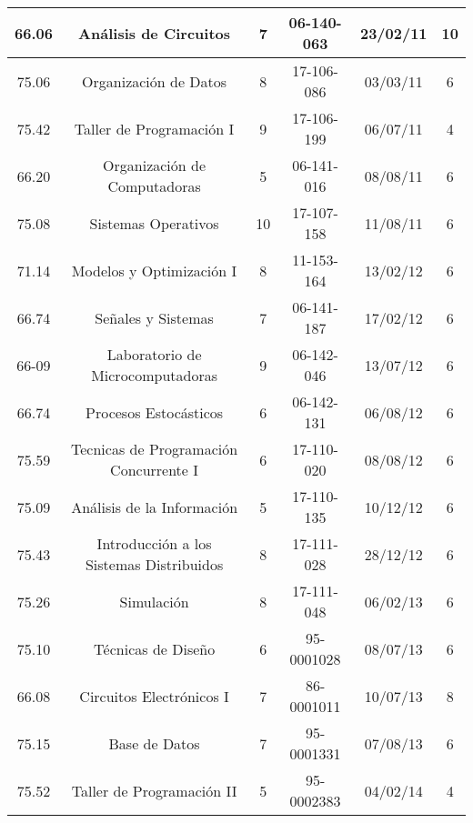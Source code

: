 {\begin{center}
\begin{tabular}{|c|c|c|c|c|c|}
            \hline
            66.06 & Análisis de Circuitos                      & 7  & 06-140-063 & 23/02/11 & 10 \\
            \hline
            75.06 & Organización de Datos                      & 8  & 17-106-086 & 03/03/11 & 6 \\
            \hline
            75.42 & Taller de Programación I                   & 9  & 17-106-199 & 06/07/11 & 4 \\
            \hline
            66.20 & Organización de Computadoras               & 5  & 06-141-016 & 08/08/11 & 6 \\
            \hline
            75.08 & Sistemas Operativos                        & 10 & 17-107-158 & 11/08/11 & 6 \\
            \hline 
            71.14 & Modelos y Optimización I                   & 8  & 11-153-164 & 13/02/12 & 6 \\
            \hline
            66.74 & Señales y Sistemas                         & 7  & 06-141-187 & 17/02/12 & 6 \\
            \hline
            66-09 & Laboratorio de Microcomputadoras           & 9  & 06-142-046 & 13/07/12 & 6 \\
            \hline
            66.74 & Procesos Estocásticos                      & 6  & 06-142-131 & 06/08/12 & 6 \\
            \hline
            75.59 & Tecnicas de Programación Concurrente I     & 6  & 17-110-020 & 08/08/12 & 6 \\
            \hline
            75.09 & Análisis de la Información                 & 5  & 17-110-135 & 10/12/12 & 6 \\
            \hline
            75.43 & Introducción a los Sistemas Distribuidos   & 8  & 17-111-028 & 28/12/12 & 6 \\
            \hline
            75.26 & Simulación                                 & 8  & 17-111-048 & 06/02/13 & 6 \\
            \hline
            75.10 & Técnicas de Diseño                         & 6  & 95-0001028 & 08/07/13 & 6 \\
            \hline
            66.08 & Circuitos Electrónicos I                   & 7  & 86-0001011 & 10/07/13 & 8 \\
            \hline
            75.15 & Base de Datos                              & 7  & 95-0001331 & 07/08/13 & 6 \\
            \hline
            75.52 & Taller de Programación II                  & 5  & 95-0002383 & 04/02/14 & 4 \\

\end{tabular}
\end{center}}
